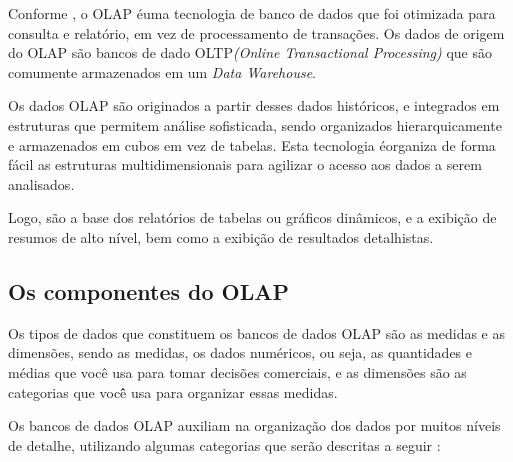 Conforme \cite{dw-kimball-2013}, o OLAP \'{e}uma tecnologia de banco de dados que foi otimizada para consulta e relat\'{o}rio, em vez de processamento de transa\c{c}\~{o}es. Os dados de origem do OLAP s\~{a}o bancos de dado OLTP\textit{(Online Transactional Processing)} que s\~{a}o comumente armazenados em um \textit{Data Warehouse}.

Os dados OLAP s\~{a}o originados a partir desses dados hist\'{o}ricos, e integrados em estruturas que permitem an\'{a}lise sofisticada, sendo organizados hierarquicamente e armazenados em cubos em vez de tabelas. Esta tecnologia \'{e}organiza de forma f\'{a}cil as estruturas multidimensionais para agilizar o acesso aos dados a serem analisados. 

Logo, s\~{a}o a base dos relat\'{o}rios de tabelas ou gr\'{a}ficos dinâmicos, e a exibi\c{c}\~{a}o de resumos de alto n\'{i}vel, bem como a exibi\c{c}\~{a}o de resultados detalhistas.

\subsection{Os componentes do OLAP}

Os tipos de dados que constituem os bancos de dados OLAP s\~{a}o as medidas e as dimens\~{o}es, sendo as medidas, os dados num\'{e}ricos, ou seja, as quantidades e m\'{e}dias que você usa para tomar decis\~{o}es comerciais, e as dimens\~{o}es s\~{a}o as categorias que voc\^{e}̂ usa para organizar essas medidas.

Os bancos de dados OLAP auxiliam na organiza\c{c}\~{a}o dos dados por muitos n\'{i}veis de detalhe, utilizando algumas categorias que ser\~{a}o descritas a seguir \cite{olap-microsoft-2020}:

